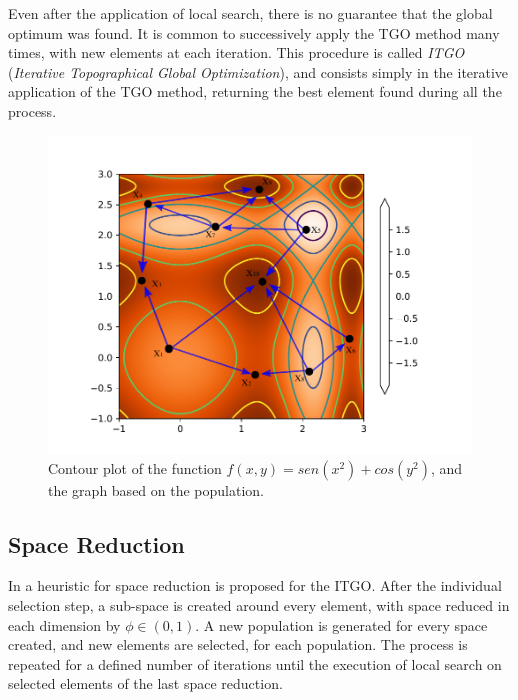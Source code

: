 Even after the application of local search, there is no guarantee that the global optimum was found. It is common to successively apply the TGO method many times, with new elements at each iteration. This procedure is called \textit{ITGO} (\textit{Iterative Topographical Global Optimization}), and consists simply in the iterative application of the TGO method, returning the best element found during all the process.



\begin{figure}[tp]
\begin{center}
\includegraphics[scale=0.6]{fig_1.pdf}
\end{center}
\captionsetup{justification=centering}
\vspace*{-7mm} 
\caption{Contour plot of the function $f(x, y) = sen(x^2) + cos(y^2)$, and the graph based on the population.}\label{fig:Graph}
\end{figure}


\subsection{Space Reduction}

In \cite{ITGO4} a heuristic for space reduction is proposed for the ITGO. After the individual selection step, a sub-space is created around every element, with space reduced in each dimension by $\phi \in (0, 1)$. A new population is generated for every space created, and new elements are selected, for each population. The process is repeated for a defined number of iterations until the execution of local search on selected elements of the last space reduction.

